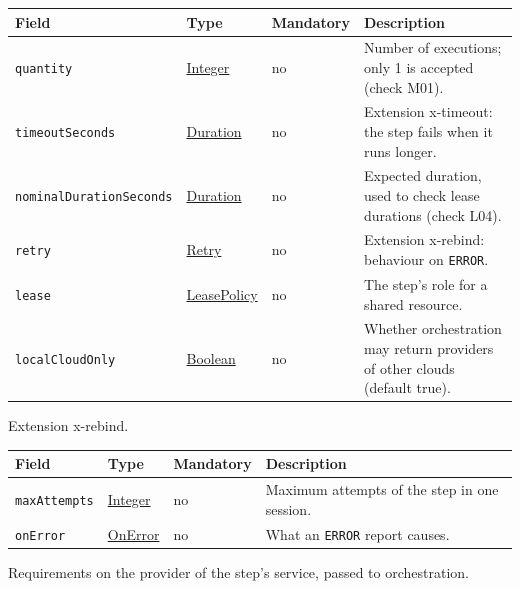 \documentclass[a4paper]{arrowhead}
\newcommand{\mref}[1]{{\textcolor{ArrowheadPurple}{\hyperref[sec:model:#1]{#1}}}}
\newcommand{\pref}[1]{{\textcolor{ArrowheadGrey}{\hyperref[sec:model:primitives:#1]{#1}}}}
\begin{document}
{\small
\begin{longtable}{|p{3.7cm}|p{4.2cm}|p{1.6cm}|p{6.3cm}|}

\hline
\rowcolor{gray!33} Field & Type & Mandatory & Description \\ \hline
\endhead
\texttt{quantity} & \pref{Integer} & no & Number of executions; only 1 is accepted (check M01). \\ \hline
\texttt{timeoutSeconds} & \pref{Duration} & no & Extension x-timeout: the step fails when it runs longer. \\ \hline
\texttt{nominalDurationSeconds} & \pref{Duration} & no & Expected duration, used to check lease durations (check L04). \\ \hline
\texttt{retry} & \mref{Retry} & no & Extension x-rebind: behaviour on \texttt{ERROR}. \\ \hline
\texttt{lease} & \mref{LeasePolicy} & no & The step's role for a shared resource. \\ \hline
\texttt{localCloudOnly} & \pref{Boolean} & no & Whether orchestration may return providers of other clouds (default true). \\ \hline
\end{longtable}
}

Extension x-rebind.

{\small
\begin{longtable}{|p{3.7cm}|p{4.2cm}|p{1.6cm}|p{6.3cm}|}

\hline
\rowcolor{gray!33} Field & Type & Mandatory & Description \\ \hline
\endhead
\texttt{maxAttempts} & \pref{Integer} & no & Maximum attempts of the step in one session. \\ \hline
\texttt{onError} & \mref{OnError} & no & What an \texttt{ERROR} report causes. \\ \hline
\end{longtable}
}

Requirements on the provider of the step's service, passed to orchestration.
\end{document}
